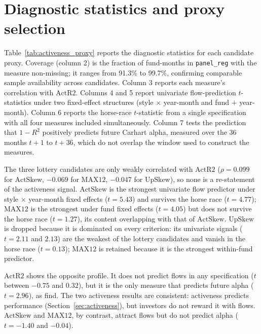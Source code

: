 \documentclass[12pt, oneside]{report}
\begin{document}
\section{Diagnostic statistics and proxy selection}
\label{sec:proxy_diagnostics}

\noindent Table~\ref{tab:activeness_proxy} reports the diagnostic
statistics for each candidate proxy. Coverage (column 2) is the
fraction of fund-months in \texttt{panel\_reg} with the measure
non-missing; it ranges from 91.3\% to 99.7\%, confirming comparable
sample availability across candidates. Column 3 reports each measure's
correlation with $\text{ActR2}$. Columns 4 and 5 report univariate
flow-prediction $t$-statistics under two fixed-effect structures (style
$\times$ year-month and fund $+$ year-month). Column 6 reports the
horse-race $t$-statistic from a single specification with all four
measures included simultaneously. Column 7 tests the
\textcite{AmihudGoyenko2013} prediction that $1-R^2$ positively predicts
future Carhart alpha, measured over the 36 months $t+1$ to $t+36$, which
do not overlap the window used to construct the measures.



The three lottery candidates are only weakly correlated with
$\text{ActR2}$ ($\rho = 0.099$ for $\text{ActSkew}$, $-0.069$ for
$\text{MAX12}$, $-0.047$ for $\text{UpSkew}$), so none is a re-statement
of the activeness signal. $\text{ActSkew}$ is the strongest univariate
flow predictor under style $\times$ year-month fixed effects
($t = 5.43$) and survives the horse race ($t = 4.77$); $\text{MAX12}$ is
the strongest under fund fixed effects ($t = 4.05$) but does not survive
the horse race ($t = 1.27$), its content overlapping with that of
$\text{ActSkew}$. $\text{UpSkew}$ is dropped because it is dominated on
every criterion: its univariate signals ($t = 2.11$ and $2.13$) are the
weakest of the lottery candidates and vanish in the horse race
($t = 0.13$); $\text{MAX12}$ is retained because it is the strongest
within-fund predictor.

$\text{ActR2}$ shows the opposite profile. It does not predict flows in
any specification ($t$ between $-0.75$ and $0.32$), but it is the only
measure that predicts future alpha ($t = 2.96$), as
\textcite{AmihudGoyenko2013} find. The two activeness results are
consistent: activeness predicts performance
(Section~\ref{sec:activeness}), but investors do not reward it with
flows. $\text{ActSkew}$ and $\text{MAX12}$, by contrast, attract flows
but do not predict alpha ($t = -1.40$ and $-0.04$).
\end{document}

